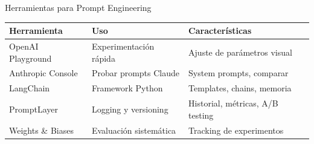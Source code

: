 \documentclass[aspectratio=169]{beamer}
\begin{document}
\begin{frame}{Herramientas para Prompt Engineering}
    \begin{table}[]
        \centering
        \renewcommand{\arraystretch}{1.3}
        \scriptsize
        \begin{tabular}{p{3cm} p{4cm} p{4.5cm}}
            \toprule
            \textbf{Herramienta} & \textbf{Uso} & \textbf{Características} \\
            \midrule
            OpenAI Playground & Experimentación rápida & Ajuste de parámetros visual \\
            Anthropic Console & Probar prompts Claude & System prompts, comparar \\
            LangChain & Framework Python & Templates, chains, memoria \\
            PromptLayer & Logging y versioning & Historial, métricas, A/B testing \\
            Weights \& Biases & Evaluación sistemática & Tracking de experimentos \\
            \bottomrule
        \end{tabular}
    \end{table}

\end{frame}
\end{document}
